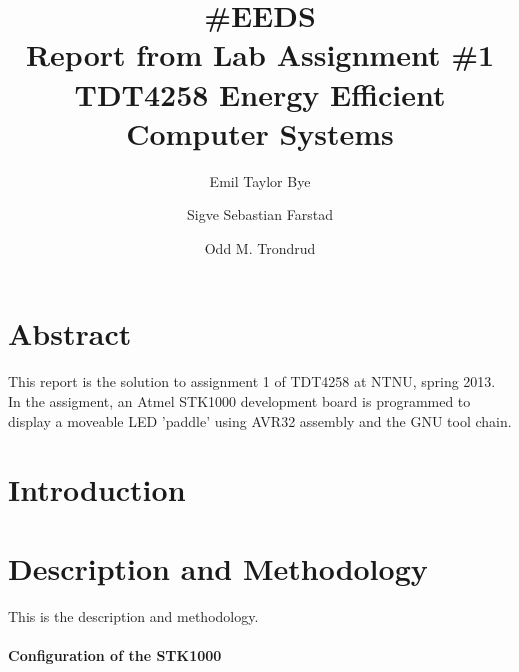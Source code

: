 \documentclass{article}
\begin{document}

\title{\#EEDS\\Report from Lab Assignment \#1\\TDT4258 Energy Efficient Computer Systems}
\author{Emil Taylor Bye}
\author{Sigve Sebastian Farstad}
\author{Odd M. Trondrud}
\maketitle

\newpage

\setcounter{secnumdepth}{-1}


\part{Abstract}

This report is the solution to assignment 1 of TDT4258 at NTNU, spring 2013.
In the assigment, an Atmel STK1000 development board is programmed to display a moveable LED 'paddle' using AVR32 assembly and the GNU tool chain.

\part{Introduction}



\part{Description and Methodology}

This is the description and methodology.

\subsection{Configuration of the STK1000}
\end{document}
